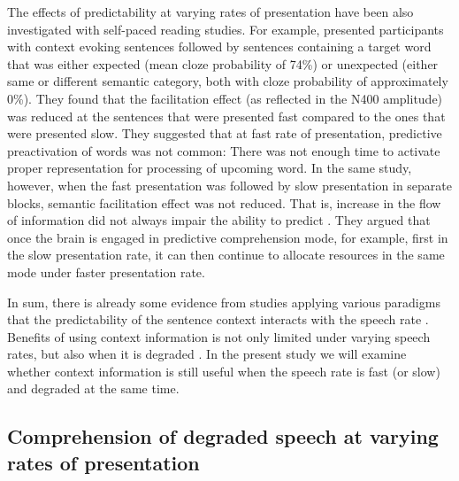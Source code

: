 \documentclass[a4paper, nobind]{templates/ociamthesis}
\begin{document}
The effects of predictability at varying rates of presentation have been also investigated with self-paced reading studies.
For example, \textcite{Wlotko2015} presented participants with context evoking sentences followed by sentences containing a target word that was either expected (mean cloze probability of 74\%) or unexpected (either same or different semantic category, both with cloze probability of approximately 0\%).
They found that the facilitation effect (as reflected in the N400 amplitude) was reduced at the sentences that were presented fast compared to the ones that were presented slow.
They suggested that at fast rate of presentation, predictive preactivation of words was not common: There was not enough time to activate proper representation for processing of upcoming word.
In the same study, however, when the fast presentation was followed by slow presentation in separate blocks, semantic facilitation effect was not reduced.
That is, increase in the flow of information did not always impair the ability to predict \autocite[see also,][]{Cole2020}.
They argued that once the brain is engaged in predictive comprehension mode, for example, first in the slow presentation rate, it can then continue to allocate resources in the same mode under faster presentation rate.

In sum, there is already some evidence from studies applying various paradigms that the predictability of the sentence context interacts with the speech rate \autocite{Aydelott2004,Sharit2003,Winn2021b,Wlotko2015}.
Benefits of using context information is not only limited under varying speech rates, but also when it is degraded \autocite{Bhandari2021,Obleser2010,Sheldon2008a,Sheldon2008b}.
In the present study we will examine whether context information is still useful when the speech rate is fast (or slow) and degraded at the same time.

\hypertarget{comprehension-of-degraded-speech-at-varying-rates-of-presentation}{%
\subsection{Comprehension of degraded speech at varying rates of presentation}\label{comprehension-of-degraded-speech-at-varying-rates-of-presentation}}
\end{document}
